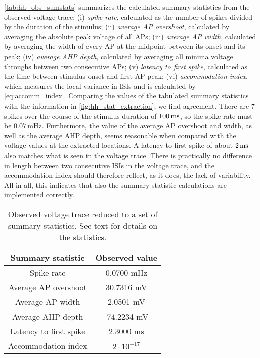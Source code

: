 \autoref{tab:hh_obs_sumstats} summarizes the calculated summary statistics from the observed voltage trace; (i) \textit{spike rate}, calculated as the number of spikes divided by the duration of the stimulus; (ii) \textit{average AP overshoot}, calculated by averaging the absolute peak voltage of all APs; (iii) \textit{average AP width}, calculated by averaging the width of every AP at the midpoint between its onset and its peak; (iv) \textit{average AHP depth}, calculated by averaging all minima voltage throughs between two consecutive APs; (v) \textit{latency to first spike}, calculated as the time between stimulus onset and first AP peak; (vi) \textit{accommodation index}, which measures the local variance in ISIs and is calculated by \autoref{eq:accomm_index}. Comparing the values of the tabulated summary statistics with the information in \autoref{fig:hh_stat_extraction}, we find agreement. There are 7 spikes over the course of the stimulus duration of $100 \,\mathrm{ms}$, so the spike rate must be $0.07 \, \mathrm{mHz}$. Furthermore, the value of the average AP overshoot and width, as well as the average AHP depth, seems reasonable when compared with the voltage values at the extracted locations. A latency to first spike of about $2 \,\mathrm{ms}$ also matches what is seen in the voltage trace. There is practically no difference in length between two consecutive ISIs in the voltage trace, and the accommodation index should therefore reflect, as it does, the lack of variability. All in all, this indicates that also the summary statistic calculations are implemented correctly. 

\begin{table}[!htb]
  \caption{Observed voltage trace reduced to a set of summary statistics. See text for details on the statistics.  }
  \begin{center}
    \begin{tabular}{cc}
      \toprule
      \textbf{Summary statistic} & \textbf{Observed value} \\
      \midrule
      Spike rate &  0.0700 mHz \\
      Average AP overshoot & 30.7316 mV  \\
      Average AP width &  2.0501 mV \\
      Average AHP depth & -74.2234 mV \\
      Latency to first spike & 2.3000 ms \\
      Accommodation index &  $2 \cdot 10^{-17}$ \\
      \bottomrule
    \end{tabular}
  \end{center}
  \label{tab:hh_obs_sumstats}
\end{table}

